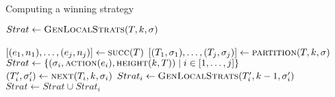 

\begin{algorithm}
   \caption{Computing a winning strategy}\label{alg:strat}
   \begin{algorithmic}[1]
            \State $Strat \gets \Call{GenLocalStrats}{T, k, \sigma}$
            \State {}
        \EndFunction
        \Statex

            \State $[(e_1, n_1),\ldots,(e_j, n_j)] \gets \Call{succ}{T}$
            \State $[(T_1,\sigma_1),\ldots,(T_j, \sigma_j)] \gets \Call{partition}{T, k, \sigma}$
            \State $Strat \gets \{(\sigma_i, \Call{action}{e_i}, \Call{height}{k, T}) \mid i \in[1,\ldots,j]\}$\label{alg:strat:strati}
            \label{alg:strat:for}
            \State $(T_i', \sigma_i') \gets \Call{next}{T_i, k, \sigma_i}$\label{alg:strat:next}
                \State $Strat_i \gets \Call{GenLocalStrats}{T_i', k-1, \sigma_i'}$\label{alg:strat:rec}
                \State $Strat \gets Strat \cup Strat_i$
            \EndFor\label{alg:strat:endfor}
            \State {} \label{alg:strat:return}
        \EndFunction
    \end{algorithmic}
\end{algorithm}


